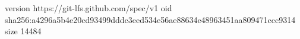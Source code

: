version https://git-lfs.github.com/spec/v1
oid sha256:a4296a5b4e20cd93499dddc3eed534e56ae88634e48963451aa809471ccc9314
size 14484
